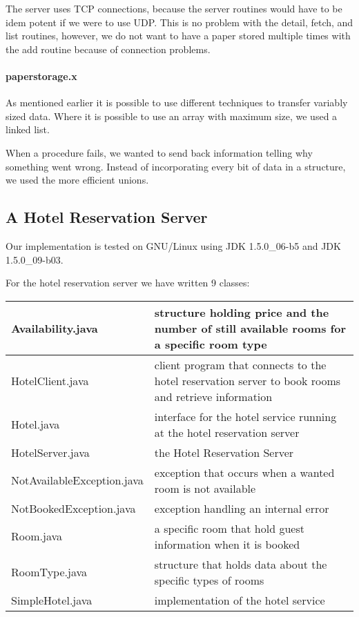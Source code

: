 \documentclass[a4paper,10pt]{article}
\begin{document}
The server uses TCP connections, because the server routines would have to be idem potent if we were to use UDP. This is no problem with the detail, fetch, and list routines, however, we do not want to have a paper stored multiple times with the add routine because of connection problems. 

\paragraph{paperstorage.x}
As mentioned earlier it is possible to use different techniques to transfer variably sized data. Where it is possible to use an array with maximum size, we used a linked list.

When a procedure fails, we wanted to send back information telling why something went wrong. Instead of incorporating every bit of data in a structure, we used the more efficient unions.

\subsection{A Hotel Reservation Server}\label{sec:hotel}
Our implementation is tested on GNU/Linux using JDK 1.5.0\_06-b5 and JDK 1.5.0\_09-b03.

For the hotel reservation server we have written 9 classes:
\begin{center}
\begin{tabular}{ l | p{7.0cm} }
Availability.java & structure holding price and the number of still available rooms for a specific room type\\ \hline
HotelClient.java & client program that connects to the hotel reservation server to book rooms and retrieve information\\ \hline
Hotel.java & interface for the hotel service running at the hotel reservation server\\ \hline
HotelServer.java & the Hotel Reservation Server\\ \hline
NotAvailableException.java & exception that occurs when a wanted room is not available\\ \hline
NotBookedException.java & exception handling an internal error\\ \hline
Room.java & a specific room that hold guest information when it is booked\\ \hline
RoomType.java & structure that holds data about the specific types of rooms\\ \hline
SimpleHotel.java & implementation of the hotel service\\
\end{tabular}
\end{center}
\end{document}
